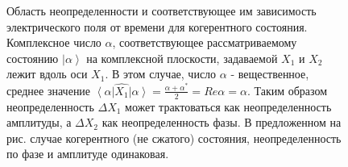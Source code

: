 \begin{figure}
\centering



\caption{Область неопределенности и соответствующее им зависимость
  электрического поля от времени для когерентного
  состояния.
  Комплексное число $\alpha$,
  соответствующее рассматриваемому состоянию $\left|\alpha\right>$ на
  комплексной плоскости, задаваемой $X_1$ и $X_2$ лежит вдоль оси
  $X_1$.
  В этом случае, число $\alpha$ - вещественное, среднее значение
  $\left<\alpha\right|\hat{X_1}\left|\alpha\right> =
  \frac{\alpha + \alpha^\ast}{2} = 
  Re \alpha = \alpha$.
  Таким образом неопределенность $\Delta X_1$ может
  трактоваться как неопределенность амплитуды, а $\Delta X_2$ как
  неопределенность фазы. В предложенном на рис. случае когерентного
  (не сжатого) состояния, неопределенность по фазе и амплитуде одинаковая.}
\label{figPart3Squeezed_1}
\end{figure}
